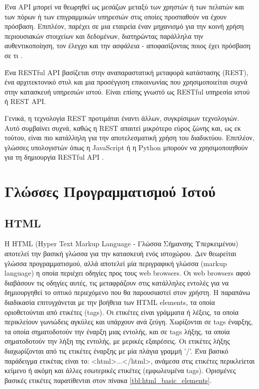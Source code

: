 Ένα API μπορεί να θεωρηθεί ως μεσάζων μεταξύ των χρηστών ή των πελατών και των πόρων ή των επιγραμμικών υπηρεσιών στις οποίες προσπαθούν να έχουν πρόσβαση. Επιπλέον, παρέχει σε μια εταιρεία έναν μηχανισμό για την κοινή χρήση περιουσιακών στοιχείων και δεδομένων, διατηρώντας παράλληλα την αυθεντικοποίηση, τον έλεγχο και την ασφάλεια - αποφασίζοντας ποιος έχει πρόσβαση σε τι \cite{RedHat_2020}. 

Ένα RESTful API βασίζεται στην αναπαραστατική μεταφορά κατάστασης (REST), ένα αρχιτεκτονικό στυλ και μια προσέγγιση επικοινωνίας που χρησιμοποιείται συχνά στην κατασκευή υπηρεσιών ιστού. Είναι επίσης γνωστό ως RESTful υπηρεσία ιστού ή REST API.

Γενικά, η τεχνολογία REST προτιμάται έναντι άλλων, συγκρίσιμων τεχνολογιών. Αυτό συμβαίνει συχνά, καθώς η REST απαιτεί μικρότερο εύρος ζώνης και, ως εκ τούτου, είναι πιο κατάλληλη για την αποτελεσματική χρήση του διαδικτύου. Επιπλέον, γλώσσες υπολογιστών όπως η JavaScript ή η Python μπορούν να χρησιμοποιηθούν για τη δημιουργία RESTful API \cite{Gillis_2020}.

\section{Γλώσσες Προγραμματισμού Ιστού}

\subsection{HTML}
Η HTML (Hyper Text Markup Language - Γλώσσα Σήμανσης Υπερκειμένου) αποτελεί την βασική γλώσσα για την κατασκευή ενός ιστοχώρου. Δεν θεωρείται γλώσσα προγραμματισμού, αλλά αποτελεί μία περιγραφική γλώσσα (markup language) η οποία περιέχει οδηγίες προς τους web browsers. Οι web browsers αφού διαβάσουν τις οδηγίες αυτές, τις μεταφράζουν στις κατάλληλες εντολές για να δημιουργηθεί το οπτικό περιεχόμενο που θα παρουσιαστεί στον χρήστη. Η παραπάνω διαδικασία επιτυγχάνεται με την βοήθεια των HTML elements, τα οποία οριοθετούνται από ετικέτες (tags). Οι ετικέτες είναι γράμματα ή λέξεις, τα οποία περικλείουν γωνιώδεις αγκύλες και υπάρχουν ανά ζεύγη. Χωρίζονται σε tags έναρξης, τα οποία σηματοδοτούν την έναρξη μιας εντολής, και σε tags λήξης, τα οποία σηματοδοτούν την λήξη της εντολής, με μερικές εξαιρέσεις. Οι ετικέτες λήξης διαχωρίζονται από τις ετικέτες έναρξης με μία πλάγια γραμμή '/'. Ένα βασικό παράδειγμα ετικέτας είναι το: <html>...</html>, ανάμεσα στις ετικέτες περικλείεται κείμενο ή ακόμη και άλλες εσωτερικές ετικέτες (εμφωλευμένα tags). Ορισμένες βασικές ετικέτες παρατίθενται στον πίνακα \ref{tbl:html_basic_elements}.


